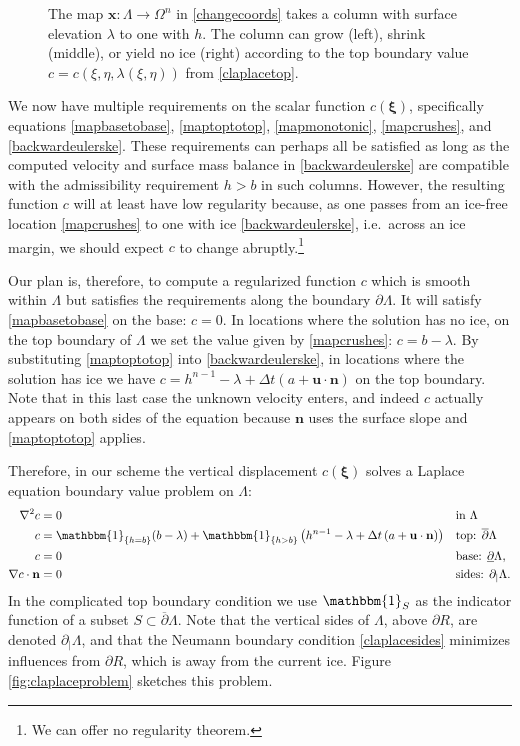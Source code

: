 \documentclass[letterpaper,final,12pt,reqno]{amsart}
\newcommand{\grad}{\nabla}
\newcommand{\bn}{\mathbf{n}}
\newcommand{\bu}{\mathbf{u}}
\newcommand{\bx}{\mathbf{x}}
\newcommand{\bxi}{\bm{\xi}}
\begin{document}
\begin{figure}[ht]

\caption{The map $\bx:\Lambda \to \Omega^n$ in \eqref{changecoords} takes a column with surface elevation $\lambda$ to one with $h$.  The column can grow (left), shrink (middle), or yield no ice (right) according to the top boundary value $c=c(\xi,\eta,\lambda(\xi,\eta))$ from \eqref{claplacetop}.}
\label{fig:mapI}
\end{figure}

We now have multiple requirements on the scalar function $c(\bxi)$, specifically equations \eqref{mapbasetobase}, \eqref{maptoptotop}, \eqref{mapmonotonic}, \eqref{mapcrushes}, and \eqref{backwardeulerske}.  These requirements can perhaps all be satisfied as long as the computed velocity and surface mass balance in \eqref{backwardeulerske} are compatible with the admissibility requirement $h>b$ in such columns.  However, the resulting function $c$ will at least have low regularity because, as one passes from an ice-free location \eqref{mapcrushes} to one with ice \eqref{backwardeulerske}, i.e.~across an ice margin, we should expect $c$ to change abruptly.\footnote{We can offer no regularity theorem.}

Our plan is, therefore, to compute a regularized function $c$ which is smooth within $\Lambda$ but satisfies the requirements along the boundary $\partial \Lambda$.  It will satisfy \eqref{mapbasetobase} on the base: $c=0$.  In locations where the solution has no ice, on the top boundary of $\Lambda$ we set the value given by \eqref{mapcrushes}: $c=b-\lambda$.  By substituting \eqref{maptoptotop} into \eqref{backwardeulerske}, in locations where the solution has ice we have $c=h^{n-1}-\lambda + \Delta t\left(a + \bu \cdot \bn\right)$ on the top boundary.  Note that in this last case the unknown velocity enters, and indeed $c$ actually appears on both sides of the equation because $\bn$ uses the surface slope and \eqref{maptoptotop} applies.

Therefore, in our scheme the vertical displacement $c(\bxi)$ solves a Laplace equation boundary value problem on $\Lambda$:
\begin{align}
        \grad^2 c &= 0 &&\text{in } \Lambda \label{claplace} \\
                c &= \mathbbm{1}_{\{h=b\}} (b-\lambda) + \mathbbm{1}_{\{h>b\}} \left(h^{n-1}-\lambda + \Delta t\left(a + \bu \cdot \bn\right)\right) &&\text{top: } \overline{\partial} \Lambda  \label{claplacetop} \\
                c &= 0 &&\text{base: } \underline{\partial} \Lambda,  \label{claplacebase} \\
 \grad c\cdot \bn &= 0 &&\text{sides: } \partial_{|} \Lambda.  \label{claplacesides}
\end{align}
In the complicated top boundary condition we use $\mathbbm{1}_S$ as the indicator function of a subset $S\subset \overline{\partial} \Lambda$.  Note that the vertical sides of $\Lambda$, above $\partial R$, are denoted $\partial_{|} \Lambda$, and that the Neumann boundary condition \eqref{claplacesides} minimizes influences from $\partial R$, which is away from the current ice.  Figure \ref{fig:claplaceproblem} sketches this problem.
\end{document}
